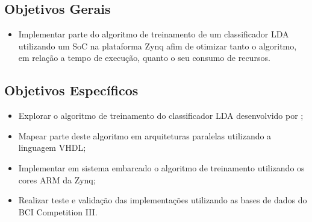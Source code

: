 \subsection{Objetivos Gerais}
\begin{itemize}
	\item Implementar parte do algoritmo de treinamento de um classificador LDA utilizando um SoC na plataforma Zynq afim de otimizar tanto o algoritmo, em relação a tempo de execução, quanto o seu consumo de recursos.
\end{itemize} 
\subsection{Objetivos Específicos}

\begin{itemize}
	\item Explorar o algoritmo de treinamento do classificador LDA desenvolvido por \cite{F.Lotte};
	\item Mapear parte deste algoritmo em arquiteturas paralelas utilizando a linguagem VHDL;
	\item Implementar em sistema embarcado o algoritmo de treinamento utilizando os cores ARM da Zynq;
	\item Realizar teste e validação das implementações utilizando as bases de dados do BCI Competition III.
\end{itemize}
